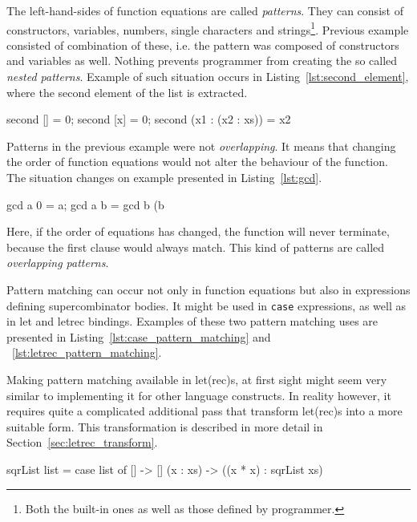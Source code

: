\documentclass[12pt,a4paper]{report}
\begin{document}
The left-hand-sides of function equations are called \textit{patterns}. They
can consist of constructors, variables, numbers, single characters and
strings\footnote{Both the built-in ones as well as those defined by
programmer.}. Previous example consisted of combination of these, i.e. the
pattern was composed of constructors and variables as well. Nothing prevents
programmer from creating the so called \textit{nested patterns}. Example of
such situation occurs in Listing~\ref{lst:second_element}, where the
second element of the list is extracted.

\vspace*{0.2in}
\begin{code}[style=haskell,label=lst:second_element,caption={Greatest common divisor.}]
second [] = 0;
second [x] = 0;
second (x1 : (x2 : xs)) = x2
\end{code}

Patterns in the previous example were not \textit{overlapping}. It means that
changing the order of function equations would not alter the behaviour of the
function. The situation changes on example presented in Listing~\ref{lst:gcd}.

\vspace*{0.2in}
\begin{code}[style=haskell,label=lst:gcd,caption={Greatest common divisor.}]
gcd a 0 = a;
gcd a b = gcd b (b %
\end{code}

Here, if the order of equations has changed, the function will never terminate,
because the first clause would always match. This kind of patterns are called
\textit{overlapping patterns}.

Pattern matching can occur not only in function equations but also in
expressions defining supercombinator bodies. It might be used in \texttt{case}
expressions, as well as in let and letrec bindings. Examples of these two
pattern matching uses are presented in Listing~\ref{lst:case_pattern_matching}
and ~\ref{lst:letrec_pattern_matching}.

Making pattern matching available in let(rec)s, at first sight might seem very
similar to implementing it for other language constructs. In reality however,
it requires quite a complicated additional pass that transform let(rec)s into
a more suitable form. This transformation is described in more detail in
Section~\ref{sec:letrec_transform}.

\vspace*{0.2in}
\begin{code}[style=haskell,label=lst:case_pattern_matching,caption={Pattern matching in
case expressions.}]
sqrList list =
    case list of
        [] -> []
        (x : xs) -> ((x * x) : sqrList xs)
\end{code}
\end{document}
